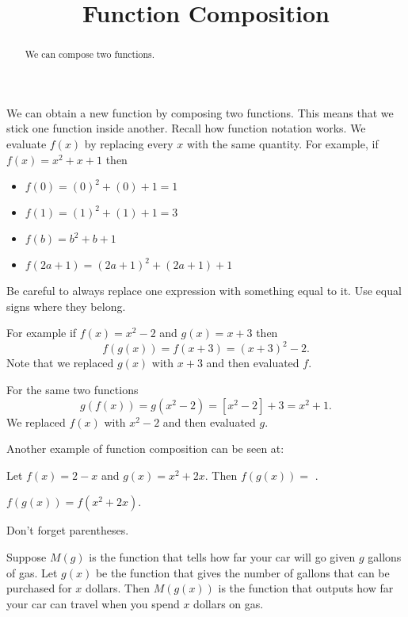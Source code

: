 \documentclass{ximera}
\title{Function Composition}
\begin{document}
\begin{abstract}
We can compose two functions.
\end{abstract}
\maketitle


We can obtain a new function by composing two functions. This means that we stick one function inside another. Recall how function notation works. We evaluate $f(x)$ by replacing every $x$ with the same quantity. For example, if $f(x)=x^2+x+1$ then 
\begin{itemize}
\item $f(0)=(0)^2+(0)+1=1$
\item $f(1)=(1)^2+(1)+1=3$
\item $f(b)=b^2+b+1$
\item $f(2a+1)=(2a+1)^2+(2a+1)+1$
\end{itemize}

Be careful to always replace one expression with something equal to it. Use equal signs where they belong.

For example if $f(x)=x^2-2$ and $g(x)=x+3$ then 
\[
f(g(x))=f(x+3)=(x+3)^2-2.
\]
Note that we replaced $g(x)$ with $x+3$ and then evaluated $f$.

For the same two functions
\[
g(f(x))=g(x^2-2)=[x^2-2]+3=x^2+1.
\]
We replaced $f(x)$ with $x^2-2$ and then evaluated $g$.

Another example of function composition can be seen at: 

\begin{question}
Let $f(x)=2-x$ and $g(x)=x^2+2x$. Then
$f(g(x))=$ .

\begin{hint}
$f(g(x))=f(x^2+2x)$.
\end{hint}

\begin{hint}
Don't forget parentheses.
\end{hint}

\end{question}

Suppose $M(g)$ is the function that tells how far your car will go given $g$ gallons of gas. Let $g(x)$ be the function that gives the number of gallons that can be purchased for $x$ dollars. Then $M(g(x))$ is the function that outputs how far your car can travel when you spend $x$ dollars on gas. 
\end{document}
